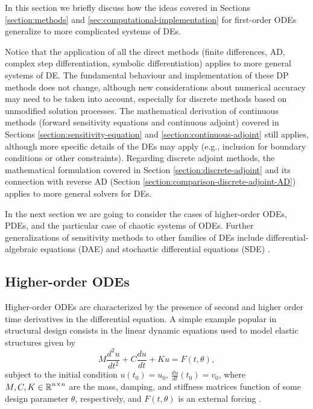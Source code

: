 In this section we briefly discuss how the ideas covered in Sections \ref{section:methods} and \ref{sec:computational-implementation} for first-order ODEs generalize to more complicated systems of DEs. 

Notice that the application of all the direct methods (finite differences, AD, complex step differentiation, symbolic differentiation) applies to more general systems of DE.
The fundamental behaviour and implementation of these DP methods does not change, although new considerations about numerical accuracy may need to be taken into account, especially for discrete methods based on unmodified solution processes.  
The mathematical derivation of continuous methods (forward sensitivity equations and continuous adjoint) covered in Sections \ref{section:sensitivity-equation} and \ref{section:continuous-adjoint} still applies, although more specific details of the DEs may apply (e.g., inclusion for boundary conditions or other constraints). 
Regarding discrete adjoint methods, the mathematical formulation covered in Section \ref{section:discrete-adjoint} and its connection with reverse AD (Section \ref{section:comparison-discrete-adjoint-AD}) applies to more general solvers for DEs. 

In the next section we are going to consider the cases of higher-order ODEs, PDEs, and the particular case of chaotic systems of ODEs. 
Further generalizations of sensitivity methods to other families of DEs include differential-algebraic equations (DAE) \cite{Cao_Li_Petzold_2002} and stochastic differential equations (SDE) \cite{li2020scalable}. 

\subsection{Higher-order ODEs}

Higher-order ODEs are characterized by the presence of second and higher order time derivatives in the differential equation. 
A simple example popular in structural design consists in the linear dynamic equations used to model elastic structures given by 
\begin{equation}
    M \frac{d^2 u}{dt^2}
    +
    C \frac{du}{dt}
    + 
    K u
    = 
    F(t, \theta),
\end{equation}
subject to the initial condition $u(t_0) = u_0$, $\frac{du}{dt}(t_0) = v_0$, where $M, C, K \in \operatorname{\mathbb{R}}^{n \times n}$ are the mass, damping, and stiffness matrices function of some design parameter $\theta$, respectively, and $F(t, \theta)$ is an external forcing \cite{min1999optimal, Jensen_Nakshatrala_Tortorelli_2014}.  

